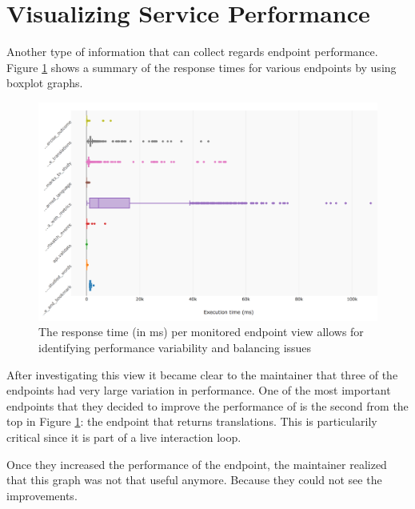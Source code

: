 \documentclass[conference]{IEEEtran}
\begin{document}
\section{Visualizing Service Performance}

  Another type of information that \tool can collect regards endpoint performance. Figure \ref{fig:ep} shows a summary of the response times for various endpoints by using boxplot graphs. 


  \begin{figure}[h!]
    \centering
    \includegraphics[width=\linewidth]{endpoint_performance.png}
    \caption{The response time (in ms) per monitored endpoint view allows for identifying performance variability and balancing issues}
    \label{fig:ep}
  \end{figure}

  After investigating this view it became clear to the maintainer that three of the endpoints had very large variation in performance. One of the most important endpoints that they decided to improve the performance of is the second from the top in Figure \ref{fig:ep}: the endpoint that returns translations. This is particularily critical since it is part of a live interaction loop. 

  \niceseparator

  Once they increased the performance of the endpoint, the maintainer realized that this graph was not that useful anymore. Because they could not see the improvements. 
\end{document}
